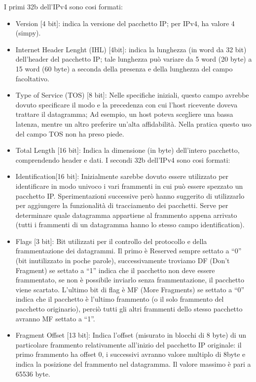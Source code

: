 I primi 32b dell’IPv4 sono cosi formati:
\begin{itemize}
\item	Version [4 bit]: indica la versione del pacchetto IP; per IPv4, ha valore 4 (simpy).
\item	Internet Header Lenght (IHL) [4bit]: indica la lunghezza (in word da 32 bit) dell’header del pacchetto IP; tale lunghezza può variare da 5 word (20 byte) a 15 word (60 byte) a seconda della presenza e della lunghezza del campo facoltativo.
\item	Type of Service (TOS) [8 bit]: Nelle specifiche iniziali, questo campo avrebbe dovuto specificare il modo e la precedenza con cui l’host ricevente doveva trattare il datagramma;
Ad esempio, un host poteva scegliere una bassa latenza, mentre un altro preferire un’alta affidabilità. Nella pratica questo uso del campo TOS non ha preso piede.
\item	Total Length [16 bit]: Indica la dimensione (in byte) dell’intero pacchetto, comprendendo header e dati.
I secondi 32b dell’IPv4 sono cosi formati:
\item	Identification[16 bit]: Inizialmente sarebbe dovuto essere utilizzato per identificare in modo univoco i vari frammenti in cui può essere spezzato un pacchetto IP. Sperimentazioni successive però hanno suggerito di utilizzarlo per aggiungere la funzionalità di tracciamento dei pacchetti. Serve per determinare quale datagramma appartiene al frammento appena arrivato (tutti i frammenti di un datagramma hanno lo stesso campo identification).
\item	Flags [3 bit]: Bit utilizzati per il controllo del protocollo e della frammentazione dei datagrammi. Il primo è Reserved sempre settato a “0” (bit inutilizzato in poche parole), successivamente troviamo DF (Don’t Fragment) se settato a “1” indica che il pacchetto non deve essere frammentato, se non è possibile inviarlo senza frammentazione, il pacchetto viene scartato. L’ultimo bit di flag è MF (More Fragments) se settato a “0” indica che il pacchetto è l’ultimo frammento (o il solo frammento del pacchetto originario), perciò tutti gli altri frammenti dello stesso pacchetto avranno MF settato a “1”. 
\item	Fragment Offset [13 bit]: Indica l’offset (misurato in blocchi di 8 byte) di un particolare frammento relativamente all’inizio del pacchetto IP originale: il primo frammento ha offset 0, i successivi avranno valore multiplo di 8byte e indica la posizione del frammento nel datagramma. Il valore massimo è pari a 65536 byte.
\end{itemize}
